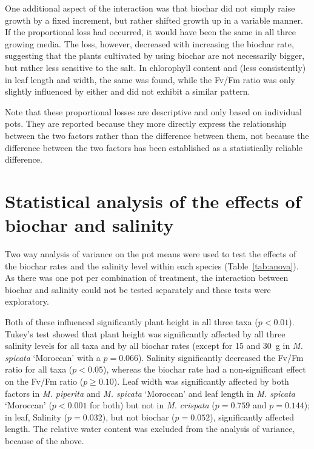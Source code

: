 One additional aspect of the interaction was that biochar did not simply raise growth by a fixed increment, but rather shifted growth up in a variable manner. If the proportional loss had occurred, it would have been the same in all three growing media. The loss, however, decreased with increasing the biochar rate, suggesting that the plants cultivated by using biochar are not necessarily bigger, but rather less sensitive to the salt. In chlorophyll content and (less consistently) in leaf length and width, the same was found, while the Fv/Fm ratio was only slightly influenced by either and did not exhibit a similar pattern.

Note that these proportional losses are descriptive and only based on individual pots. They are reported because they more directly express the relationship between the two factors rather than the difference between them, not because the difference between the two factors has been established as a statistically reliable difference.

\section{Statistical analysis of the effects of biochar and salinity}\label{sec:anova}

Two way analysis of variance on the pot means were used to test the effects of the biochar rates and the salinity level within each species (Table~\ref{tab:anova}). As there was one pot per combination of treatment, the interaction between biochar and salinity could not be tested separately and these tests were exploratory.

Both of these influenced significantly plant height in all three taxa ($p < 0.01$). Tukey's test showed that plant height was significantly affected by all three salinity levels for all taxa and by all biochar rates (except for 15 and 30~g in \textit{M. spicata} `Moroccan' with a $p = 0.066$). Salinity significantly decreased the Fv/Fm ratio for all taxa ($p < 0.05$), whereas the biochar rate had a non-significant effect on the Fv/Fm ratio ($p \geq 0.10$). Leaf width was significantly affected by both factors in \textit{M. piperita} and \textit{M. spicata} `Moroccan' and leaf length in \textit{M. spicata} `Moroccan' ($p < 0.001$ for both) but not in \textit{M. crispata} ($p = 0.759$ and $p = 0.144$); in leaf, Salinity ($p = 0.032$), but not biochar ($p = 0.052$), significantly affected length. The relative water content was excluded from the analysis of variance, because of the above.

